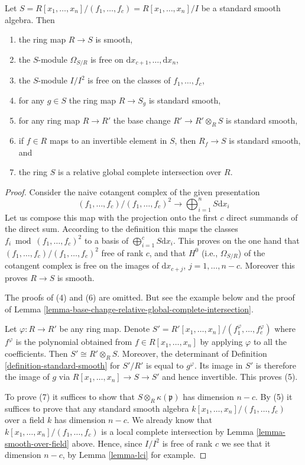 \begin{lemma}
\label{lemma-standard-smooth}
Let
$S = R[x_1, \ldots, x_n]/(f_1, \ldots, f_c) = R[x_1, \ldots, x_n]/I$
be a standard smooth algebra. Then
\begin{enumerate}
\item the ring map $R \to S$ is smooth,
\item the $S$-module $\Omega_{S/R}$ is free on
$\text{d}x_{c + 1}, \ldots, \text{d}x_n$,
\item the $S$-module $I/I^2$ is free on the classes of $f_1, \ldots, f_c$,
\item for any $g \in S$ the ring map $R \to S_g$ is standard smooth,
\item for any ring map $R \to R'$ the base change
$R' \to R'\otimes_R S$ is standard smooth,
\item if $f \in R$ maps to an invertible element in $S$, then
$R_f \to S$ is standard smooth, and
\item the ring $S$ is a relative global complete intersection over $R$.
\end{enumerate}
\end{lemma}

\begin{proof}
Consider the naive cotangent complex of the given presentation
$$
(f_1, \ldots, f_c)/(f_1, \ldots, f_c)^2
\longrightarrow
\bigoplus\nolimits_{i = 1}^n S \text{d}x_i
$$
Let us compose this map with the projection onto the first $c$ direct summands
of the direct sum. According to the definition this maps the classes
$f_i \bmod (f_1, \ldots, f_c)^2$ to a basis of
$\bigoplus_{i = 1}^c S\text{d}x_i$. This proves on the one hand that
$(f_1, \ldots, f_c)/(f_1, \ldots, f_c)^2$ free of rank $c$, and
that $H^0$ (i.e., $\Omega_{S/R}$) of the cotangent complex is free
on the images of $\text{d}x_{c + j}$, $j = 1, \ldots, n - c$.
Moreover this proves $R \to S$ is smooth.

\medskip\noindent
The proofs of (4) and (6) are omitted. But see the example below and
the proof of
Lemma \ref{lemma-base-change-relative-global-complete-intersection}.

\medskip\noindent
Let $\varphi : R \to R'$ be any ring map.
Denote $S' = R'[x_1, \ldots, x_n]/(f_1^\varphi, \ldots, f_c^\varphi)$
where $f^\varphi$ is the polynomial obtained from $f \in R[x_1, \ldots, x_n]$
by applying $\varphi$ to all the coefficients. Then $S' \cong R' \otimes_R S$.
Moreover, the determinant of Definition \ref{definition-standard-smooth}
for $S'/R'$ is equal to $g^\varphi$. Its image in $S'$ is therefore
the image of $g$ via $R[x_1, \ldots, x_n] \to S \to S'$
and hence invertible. This proves (5).

\medskip\noindent
To prove (7) it suffices to show that
$S \otimes_R \kappa(\mathfrak p)$ has dimension $n - c$.
By (5) it suffices to prove that any standard smooth
algebra $k[x_1, \ldots, x_n]/(f_1, \ldots, f_c)$
over a field $k$ has dimension $n - c$. We already
know that $k[x_1, \ldots, x_n]/(f_1, \ldots, f_c)$ is a local
complete intersection by Lemma \ref{lemma-smooth-over-field} above.
Hence, since $I/I^2$ is free of rank $c$ we see that it dimension
$n - c$, by Lemma \ref{lemma-lci} for example.
\end{proof}

